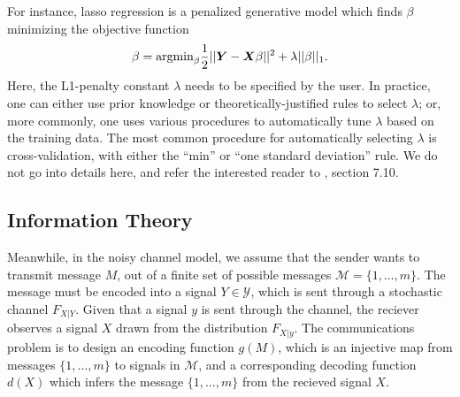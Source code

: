 For instance, lasso regression is a penalized generative model which
finds $\beta$ minimizing the objective function
\[
\beta = \text{argmin}_\beta \frac{1}{2}||\boldsymbol{Y} - \boldsymbol{X} \beta||^2 + \lambda ||\beta||_1.
\]
Here, the L1-penalty constant $\lambda$ needs to be specified by the
user.  In practice, one can either use prior knowledge or
theoretically-justified rules to select $\lambda$; or, more commonly,
one uses various procedures to automatically tune $\lambda$ based on
the training data.  The most common procedure for automatically
selecting $\lambda$ is cross-validation, with either the ``min'' or
``one standard deviation'' rule.  We do not go into details here, and
refer the interested reader to \cite{Hastie2009a}, section 7.10.




\subsection{Information Theory}\label{sec:intro_mi}

Meanwhile, in the noisy channel model, we assume that the sender wants
to transmit message $M$, out of a finite set of possible messages
$\mathcal{M} = \{1,\hdots, m\}$.  The message must be encoded into a
signal $Y \in \mathcal{Y}$, which is sent through a stochastic channel
$F_{X|Y}$.  Given that a signal $y$ is sent through the channel, the
reciever observes a signal $X$ drawn from the distribution $F_{X|y}$.
The communications problem is to design an encoding function $g(M)$,
which is an injective map from messages $\{1,\hdots,m\}$ to signals in
$\mathcal{M}$, and a corresponding decoding function $d(X)$ which
infers the message $\{1,\hdots, m\}$ from the recieved signal $X$.


